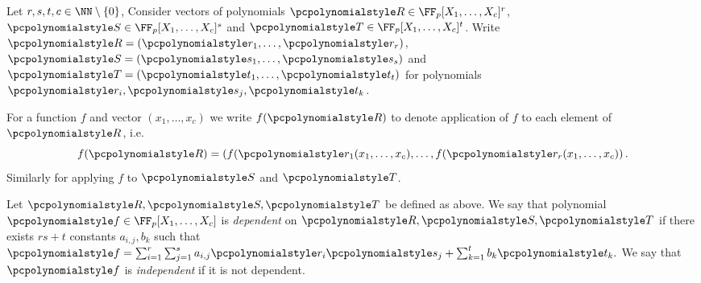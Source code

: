 \documentclass[runningheads,11pt]{llncs}
\begin{document}
Let $r, s, t, c \in \NN \setminus \smallset{0}$, Consider vectors of polynomials
$\pR \in \FF_p[X_1, \ldots, X_c]^r$, $\pS \in \FF_p[X_1, \ldots, X_c]^s$ and
$\pT \in \FF_p[X_1, \ldots, X_c]^t$. Write $\pR = \left( \p{r}_1, \ldots,
  \p{r}_r \right)$, $\pS = \left( \p{s}_1, \ldots, \p{s}_s \right)$ and $\pT =
\left( \p{t}_1, \ldots, \p{t}_t \right)$ for polynomials $\p{r}_i, \p{s}_j,
\p{t}_k$.

For a function $f$ and vector $(x_1, \ldots, x_c)$ we write $f(\pR)$ to
denote application of $f$ to each element of $\pR$, i.e.
\[
	f(\pR) = \left( f(\p{r}_1 (x_1, \ldots, x_c), \ldots, f(\p{r}_r
	(x_1, \ldots, x_c) \right).
\]
Similarly for applying $f$ to $\pS$ and $\pT$.

\begin{definition}[Independence of $\pR, \pS, \pT$]
	\label{def:independence}
	Let $\pR, \pS, \pT$ be defined as above. We say that polynomial $\p{f} \in
  \FF_p[X_1, \ldots, X_c]$ is \emph{dependent} on $\pR, \pS, \pT$ if there
  exists $rs + t$ constants $a_{i, j}, b_k$ such that $ \p{f} = \sum_{i = 1}^{r}
  \sum_{j = 1}^{s} a_{i, j} \p{r}_i \p{s}_j + \sum_{k = 1}^{t} b_k \p{t}_k. $ We
  say that $\p{f}$ is \emph{independent} if it is not dependent.
\end{definition}
\end{document}

